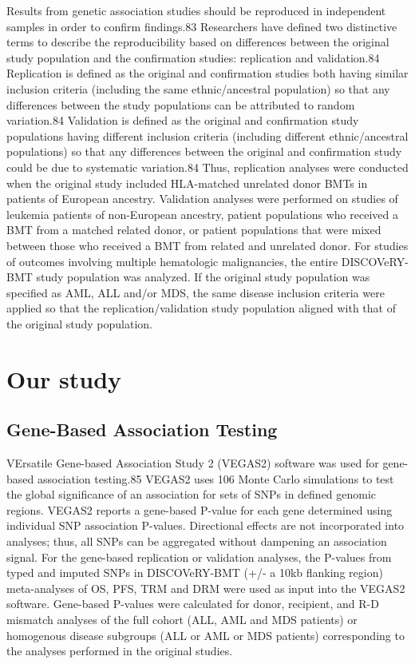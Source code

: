 \documentclass[]{DissertateUSU}
\begin{document}
Results from genetic association studies should be reproduced in
independent samples in order to confirm findings.83 Researchers have
defined two distinctive terms to describe the reproducibility based on
differences between the original study population and the confirmation
studies: replication and validation.84 Replication is defined as the
original and confirmation studies both having similar inclusion criteria
(including the same ethnic/ancestral population) so that any differences
between the study populations can be attributed to random variation.84
Validation is defined as the original and confirmation study populations
having different inclusion criteria (including different
ethnic/ancestral populations) so that any differences between the
original and confirmation study could be due to systematic variation.84
Thus, replication analyses were conducted when the original study
included HLA-matched unrelated donor BMTs in patients of European
ancestry. Validation analyses were performed on studies of leukemia
patients of non-European ancestry, patient populations who received a
BMT from a matched related donor, or patient populations that were mixed
between those who received a BMT from related and unrelated donor. For
studies of outcomes involving multiple hematologic malignancies, the
entire DISCOVeRY-BMT study population was analyzed. If the original
study population was specified as AML, ALL and/or MDS, the same disease
inclusion criteria were applied so that the replication/validation study
population aligned with that of the original study population.

\section{Our study}\label{our-study}

\subsection{Gene-Based Association
Testing}\label{gene-based-association-testing}

VErsatile Gene-based Association Study 2 (VEGAS2) software was used for
gene-based association testing.85 VEGAS2 uses 106 Monte Carlo
simulations to test the global significance of an association for sets
of SNPs in defined genomic regions. VEGAS2 reports a gene-based P-value
for each gene determined using individual SNP association P-values.
Directional effects are not incorporated into analyses; thus, all SNPs
can be aggregated without dampening an association signal. For the
gene-based replication or validation analyses, the P-values from typed
and imputed SNPs in DISCOVeRY-BMT (+/- a 10kb flanking region)
meta-analyses of OS, PFS, TRM and DRM were used as input into the VEGAS2
software. Gene-based P-values were calculated for donor, recipient, and
R-D mismatch analyses of the full cohort (ALL, AML and MDS patients) or
homogenous disease subgroups (ALL or AML or MDS patients) corresponding
to the analyses performed in the original studies.
\end{document}
